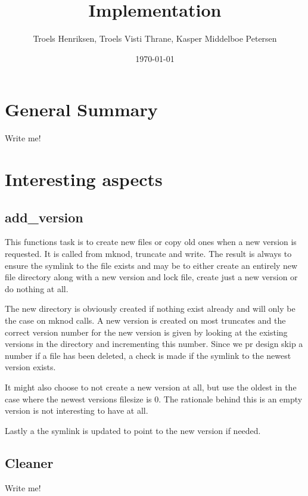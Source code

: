 \documentclass[12pt]{article}
\author{
        Troels Henriksen, Troels Visti Thrane, Kasper Middelboe Petersen
}
\date{\today}
\title{Implementation}
\begin{document}
 
\maketitle

\section{General Summary}
Write me!

\section{Interesting aspects}
\subsection{add_version}
This functions task is to create new files or copy old ones when a new version is requested. It is called from mknod, truncate and write. The result is always to ensure the symlink to the file exists and may be to either create an entirely new file directory along with a new version and lock file, create just a new version or do nothing at all.

The new directory is obviously created if nothing exist already and will only be the case on mknod calls. A new version is created on most truncates and the correct version number for the new version is given by looking at the existing versions in the directory and incrementing this number. Since we pr design skip a number if a file has been deleted, a check is made if the symlink to the newest version exists.

It might also choose to not create a new version at all, but use the oldest in the case where the newest versions filesize is 0. The rationale behind this is an empty version is not interesting to have at all.

Lastly a the symlink is updated to point to the new version if needed.

\subsection{Cleaner}
Write me!
 
\end{document}
